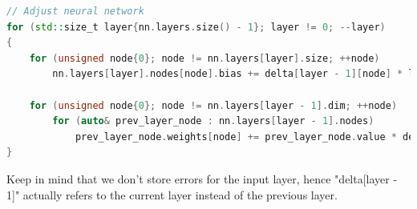 \begin{lstlisting}[language=C++]
// Adjust neural network
for (std::size_t layer{nn.layers.size() - 1}; layer != 0; --layer)
{
	for (unsigned node{0}; node != nn.layers[layer].size; ++node)
		nn.layers[layer].nodes[node].bias += delta[layer - 1][node] * learning_rate;

	for (unsigned node{0}; node != nn.layers[layer - 1].dim; ++node)
		for (auto& prev_layer_node : nn.layers[layer - 1].nodes)
			prev_layer_node.weights[node] += prev_layer_node.value * delta[layer - 1][node] * learning_rate;
}
\end{lstlisting}

Keep in mind that we don't store errors for the input layer, hence "delta[layer - 1]" actually refers to the current layer instead of the previous layer.


\filbreak
